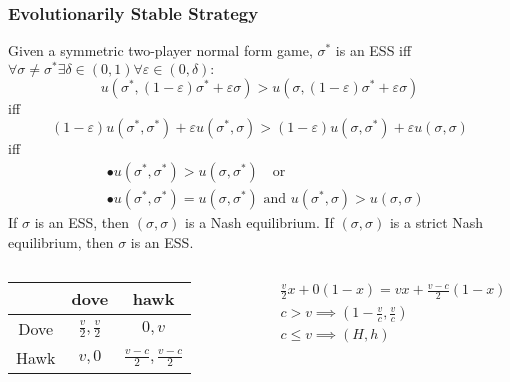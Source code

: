 \documentclass[UTF8,11pt,colorlinks,compress,openany]{beamer}%
\begin{document}
\begin{frame}\frametitle{Evolutionarily Stable Strategy}
Given a symmetric two-player normal form game, $\sigma^*$ is an ESS iff $\forall \sigma\neq \sigma^*\exists\delta\in(0,1)\forall\varepsilon\in(0,\delta):$
	\[u\left(\sigma^*,(1-\varepsilon)\sigma^*+\varepsilon \sigma\right)>u\left(\sigma,(1-\varepsilon)\sigma^*+\varepsilon \sigma\right)\]
	iff
	\[(1-\varepsilon)u\left(\sigma^*,\sigma^*\right)+\varepsilon u\left(\sigma^*,\sigma\right)>(1-\varepsilon)u\left(\sigma,\sigma^*\right)+\varepsilon u\left(\sigma,\sigma\right)\]
	iff
	\begin{align*}
	&\bullet u\left(\sigma^*,\sigma^*\right)>u\left(\sigma,\sigma^*\right)\quad\mbox{or}\\
	&\bullet u\left(\sigma^*,\sigma^*\right)=u\left(\sigma,\sigma^*\right)\mbox{ and } u\left(\sigma^*,\sigma\right)>u\left(\sigma,\sigma\right)
	\end{align*}
	If $\sigma$ is an ESS, then $(\sigma,\sigma)$ is a Nash equilibrium. If $(\sigma,\sigma)$ is a strict Nash equilibrium, then $\sigma$ is an ESS.
\begin{columns}
\begin{table}
\begin{tabu}{c|cc}
\hline
 & dove & hawk\\
\hline
Dove & $\frac{v}{2},\frac{v}{2}$ & $0,v$\\
Hawk & $v,0$ & $\frac{v-c}{2},\frac{v-c}{2}$\\
\hline
\end{tabu}
\end{table}
\vspace{-3ex}
\begin{align*}
&\frac{v}{2}x+0(1-x)=vx+\frac{v-c}{2}(1-x)\\
&c>v\implies(1-\frac{v}{c},\frac{v}{c})\\
&c\leq v\implies(H,h)
\end{align*}
\end{columns}
\end{frame}
\end{document}
